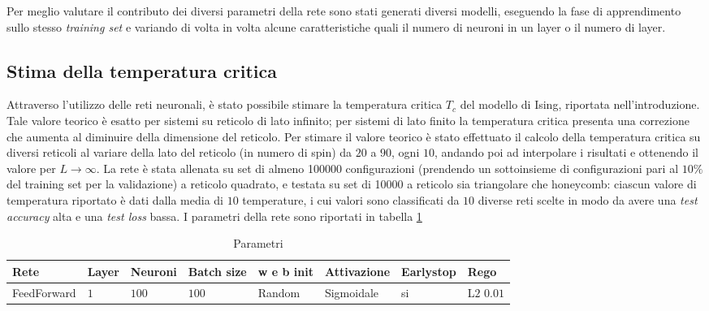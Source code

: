 \documentclass{article}
\begin{document}
Per meglio valutare il contributo dei diversi parametri della rete sono stati generati diversi modelli, eseguendo la fase di apprendimento sullo stesso \emph{training set} e variando di volta in volta alcune caratteristiche quali il numero di neuroni in un layer o il numero di layer.

\begin{figure}
\centering
{}
\end{figure}

\subsection{Stima della temperatura critica}

Attraverso l'utilizzo delle reti neuronali, è stato possibile stimare la temperatura critica $T_c$ del modello di Ising, riportata nell'introduzione. Tale valore teorico è esatto per sistemi su reticolo di lato infinito; per sistemi di lato finito la temperatura critica presenta una correzione che aumenta al diminuire della dimensione del reticolo. Per stimare il valore teorico è stato effettuato il calcolo della temperatura critica su diversi reticoli al variare della lato del reticolo (in numero di spin) da $20$ a $90$, ogni $10$, andando poi ad interpolare i risultati e ottenendo il valore per $L\rightarrow \infty$.
La rete è stata allenata su set di almeno \num{100000} configurazioni (prendendo un sottoinsieme di configurazioni pari al $10\%$ del training set per la validazione) a reticolo quadrato, e testata su set di \num{10000} a reticolo sia triangolare che honeycomb: ciascun valore di temperatura riportato è dati dalla media di $10$ temperature, i cui valori sono classificati da $10$ diverse reti scelte in modo da avere una \emph{test accuracy} alta e una \emph{test loss} bassa. I parametri della rete sono riportati in tabella \ref{tab:ffnnpar}
\begin{table}[h]
\begin{center}
\begin{tabular}{llllllll}
\toprule
Rete & Layer & Neuroni & Batch size & w e b init & Attivazione & Earlystop & Rego\\
\midrule
FeedForward & $1$ & $100$ & $100$ & Random & Sigmoidale & si & L$2$ $0.01$\\
\bottomrule
\end{tabular}
\end{center}
\caption{Parametri}
\label{tab:ffnnpar}
\end{table}
\end{document}
